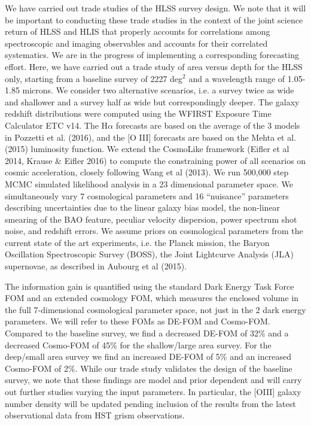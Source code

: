  We have carried out trade studies of the HLSS survey design. We note that it
 will be important to conducting these trade studies in the context of the joint
 science return of HLSS and HLIS that properly accounts for correlations among
 spectroscopic and imaging observables and accounts for their correlated
 systematics.  We are in the progress of implementing a corresponding forecasting
 effort.  Here, we have carried out a trade study of area versus depth for the
 HLSS only, starting from a baseline survey of 2227 deg$^2$ and a wavelength
 range of 1.05-1.85 microns. We consider two alternative scenarios, i.e. a survey
 twice as wide and shallower and a survey half as wide but correspondingly
 deeper.  The galaxy redshift distributions were computed using the WFIRST
 Exposure Time Calculator ETC v14. The H$\alpha$ forecasts are based on the average
 of the 3 models in Pozzetti et al. (2016), and the [O III] forecasts are based
 on the Mehta et al.  (2015) luminosity function.
 We extend the CosmoLike framework (Eifler et
 al 2014, Krause \& Eifler 2016) to compute the constraining power of all scenarios
 on cosmic acceleration, closely following Wang et al (2013). We run 500,000 step
 MCMC simulated likelihood analysis in a 23 dimensional parameter space. We
 simultaneously vary 7 cosmological parameters and 16 ``nuisance'' parameters
 describing uncertainties due to the linear galaxy bias model, the non-linear
 smearing of the BAO feature, peculiar velocity dispersion, power spectrum shot
 noise, and redshift errors. We assume priors on cosmological parameters from the
 current state of the art experiments, i.e. the Planck mission, the Baryon
 Oscillation Spectroscopic Survey (BOSS), the Joint Lightcurve Analysis (JLA)
 supernovae, as described in Aubourg et al (2015).

 The information gain is quantified using the standard Dark Energy Task Force FOM
 and an extended cosmology FOM, which measures the enclosed volume in the full
 7-dimensional cosmological parameter space, not just in the 2 dark energy
 parameters. We will refer to these FOMs as DE-FOM and Cosmo-FOM.  Compared to
 the baseline survey, we find a decreased DE-FOM of 32\% and a decreased
 Cosmo-FOM of 45\% for the shallow/large area survey. For the deep/small area
 survey we find an increased DE-FOM of 5\% and an increased Cosmo-FOM of 2\%.
 While our trade study validates the design of the baseline survey, we note that
 these findings are model and prior dependent and will carry out further studies
 varying the input parameters. In particular, the [OIII] galaxy number density
 will be updated pending inclusion of the results from the latest observational
 data from HST grism observations.

